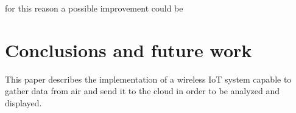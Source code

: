 \documentclass[conference]{IEEEtran}
\begin{document}
		for this reason a possible improvement could be 

\section{Conclusions and future work}
This paper describes the implementation of a wireless IoT system capable to gather data from air and send it to the cloud in order to be analyzed and displayed.

%
%
\end{document}
